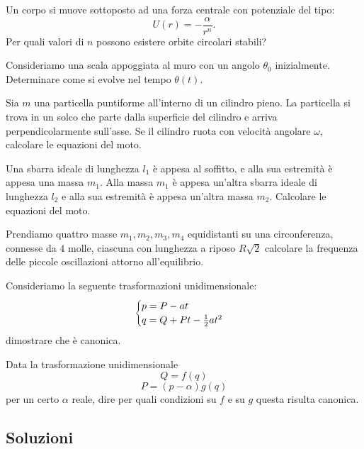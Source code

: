 \documentclass[11pt]{scrartcl}
\begin{document}
	\begin{problem}
		Un corpo si muove sottoposto ad una forza centrale con potenziale del tipo:
		$$U(r)=-\frac{\alpha}{r^n}.$$
		Per quali valori di $n$ possono esistere orbite circolari stabili?
	\end{problem}
	\begin{problem}
		Consideriamo una scala appoggiata al muro con un angolo $\theta_0$ inizialmente. Determinare come si evolve nel tempo $\theta(t)$. 
	\end{problem}
	\begin{problem}
		Sia $m$ una particella puntiforme all'interno di un cilindro pieno. La particella si trova in un solco che parte dalla superficie del cilindro e arriva perpendicolarmente sull'asse. Se il cilindro ruota con velocità angolare $\omega$, calcolare le equazioni del moto.
	\end{problem}
	\begin{problem}
		Una sbarra ideale di lunghezza $l_1$ è appesa al soffitto, e alla sua estremità è appesa una massa $m_1$. Alla massa $m_1$ è appesa un'altra sbarra ideale di lunghezza $l_2$ e alla sua estremità è appesa un'altra massa $m_2$. Calcolare le equazioni del moto.
	\end{problem}
	\begin{problem}
		Prendiamo quattro masse $m_1,m_2,m_3,m_4$ equidistanti su una circonferenza, connesse da $4$ molle, ciascuna con lunghezza a riposo $R\sqrt{2}$ calcolare la frequenza delle piccole oscillazioni attorno all'equilibrio.
	\end{problem}
	\begin{problem}
		Consideriamo la seguente trasformazioni unidimensionale:
		$$
		\begin{cases}
			p=P-at \\
			q=Q+Pt-\frac{1}{2} a t^2
		\end{cases}
		$$
		dimostrare che è canonica.
	\end{problem}
	\begin{problem}[Poisson]
		Data la trasformazione unidimensionale
		$$Q=f(q)$$
		$$P=(p-\alpha)g(q)$$
		per un certo $\alpha$ reale, dire per quali condizioni su $f$ e su $g$ questa risulta canonica.
	\end{problem}
	\newpage
	
	\subsection{Soluzioni}
	
\end{document}
